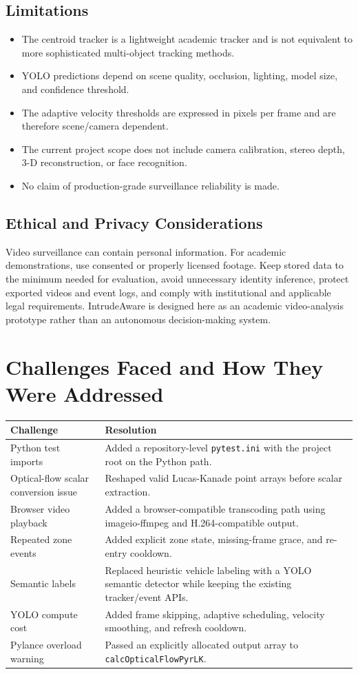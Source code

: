 \documentclass[12pt,a4paper]{report}
\newcommand{\code}[1]{\texttt{#1}}
\begin{document}
\section{Limitations}
\begin{itemize}[leftmargin=*]
  \item The centroid tracker is a lightweight academic tracker and is not equivalent to more sophisticated multi-object tracking methods.
  \item YOLO predictions depend on scene quality, occlusion, lighting, model size, and confidence threshold.
  \item The adaptive velocity thresholds are expressed in pixels per frame and are therefore scene/camera dependent.
  \item The current project scope does not include camera calibration, stereo depth, 3-D reconstruction, or face recognition.
  \item No claim of production-grade surveillance reliability is made.
\end{itemize}

\section{Ethical and Privacy Considerations}
Video surveillance can contain personal information. For academic demonstrations, use consented or properly licensed footage. Keep stored data to the minimum needed for evaluation, avoid unnecessary identity inference, protect exported videos and event logs, and comply with institutional and applicable legal requirements. IntrudeAware is designed here as an academic video-analysis prototype rather than an autonomous decision-making system.

\chapter{Challenges Faced and How They Were Addressed}
\begin{longtable}{p{}p{}}
\toprule
Challenge & Resolution\\
\midrule
Python test imports & Added a repository-level \code{pytest.ini} with the project root on the Python path.\\
Optical-flow scalar conversion issue & Reshaped valid Lucas-Kanade point arrays before scalar extraction.\\
Browser video playback & Added a browser-compatible transcoding path using imageio-ffmpeg and H.264-compatible output.\\
Repeated zone events & Added explicit zone state, missing-frame grace, and re-entry cooldown.\\
Semantic labels & Replaced heuristic vehicle labeling with a YOLO semantic detector while keeping the existing tracker/event APIs.\\
YOLO compute cost & Added frame skipping, adaptive scheduling, velocity smoothing, and refresh cooldown.\\
Pylance overload warning & Passed an explicitly allocated output array to \code{calcOpticalFlowPyrLK}.\\
\bottomrule
\end{longtable}
\end{document}
